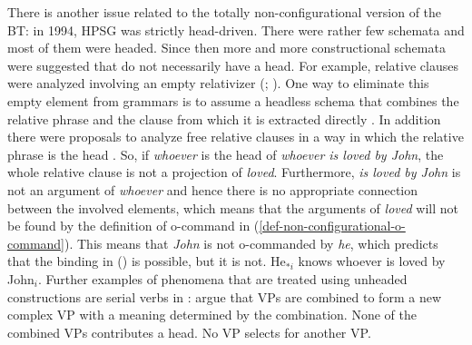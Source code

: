 \documentclass[output=paper
	        ,collection
	        ,collectionchapter
 	        ,biblatex
                ,babelshorthands
                ,newtxmath
                ,draftmode
                ,colorlinks, citecolor=brown
]{langscibook}
\begin{document}
There is another issue related to the totally non-configurational version of the BT: in 1994, HPSG was strictly
head-driven. There were rather few schemata and most of them were headed. Since then more and more
constructional schemata were suggested that do not necessarily have a head. For example, relative
clauses were analyzed involving an empty relativizer (\citealp[Chapter~5]{ps2}; ). One way to eliminate this empty element from
grammars is to assume a headless schema that combines the relative phrase and the clause from which
it is extracted directly \citep[Section~2.7]{Mueller99b}. In addition there were proposals to analyze free
relative clauses in a way in which the relative phrase is the head
\citep[]{WK2003a}. So, if \emph{whoever} is the head of \emph{whoever is loved by John}, the whole
relative clause is not a projection of \emph{loved}. Furthermore, \emph{is loved by John} is not an argument
of \emph{whoever} and hence there is no appropriate connection between the involved elements, which
means that the arguments of \emph{loved} will not be found by the definition of o-command in
(\ref{def-non-configurational-o-command}). This means that \emph{John} is not o-commanded by
\emph{he}, which predicts that the binding in () is possible, but it is not. 
\ea
He$_{*i}$ knows whoever is loved by John$_i$.
\z
Further examples of phenomena that are treated using unheaded constructions are serial verbs in
 : \citet{ML2009a} argue that VPs are combined to form a new complex VP with a
meaning determined by the combination. None of the combined VPs contributes a head. No VP selects
for another VP. 

\end{document}
